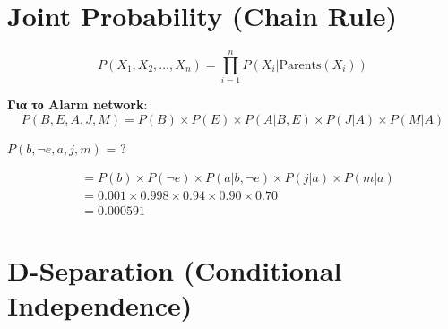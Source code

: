 \section{Joint Probability (Chain Rule)}

\begin{formulabox}
\begin{equation}
P(X_1, X_2, \ldots, X_n) = \prod_{i=1}^{n} P(X_i | \text{Parents}(X_i))
\end{equation}

\textbf{Για το Alarm network}:
\[
P(B,E,A,J,M) = P(B) \times P(E) \times P(A|B,E) \times P(J|A) \times P(M|A)
\]
\end{formulabox}

\begin{examplebox}
$P(b, \neg e, a, j, m)$ = ?

\begin{align*}
&= P(b) \times P(\neg e) \times P(a|b,\neg e) \times P(j|a) \times P(m|a) \\
&= 0.001 \times 0.998 \times 0.94 \times 0.90 \times 0.70 \\
&= \boxed{0.000591}
\end{align*}
\end{examplebox}

\section{D-Separation (Conditional Independence)}

